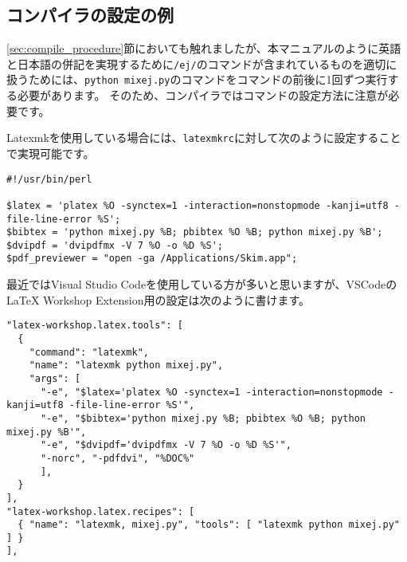 \documentclass[10pt, a4paper]{jsarticle}
\begin{document}
\subsection{コンパイラの設定の例}
\label{sec:compile_config}

\ref{sec:compile_procedure}節においても触れましたが、本マニュアルのように英語と日本語の併記を実現するために\texttt{/ej/}のコマンドが含まれているものを適切に扱うためには、\texttt{python mixej.py}のコマンドを\BibTeX コマンドの前後に1回ずつ実行する必要があります。
そのため、コンパイラでは\BibTeX コマンドの設定方法に注意が必要です。

Latexmkを使用している場合には、\texttt{latexmkrc}に対して次のように設定することで実現可能です。

\noindent\makebox[\linewidth]{\rule{\linewidth}{0.4pt}}\vspace{-0.5zw}
\begin{lstlisting}[style=onecol]
#!/usr/bin/perl

$latex = 'platex %O -synctex=1 -interaction=nonstopmode -kanji=utf8 -file-line-error %S';
$bibtex = 'python mixej.py %B; pbibtex %O %B; python mixej.py %B';
$dvipdf = 'dvipdfmx -V 7 %O -o %D %S';
$pdf_previewer = "open -ga /Applications/Skim.app";
\end{lstlisting}\vspace{-1.8zw}
\noindent\makebox[\linewidth]{\rule{\linewidth}{0.4pt}}\vspace{0.5zw}\par

最近ではVisual Studio Codeを使用している方が多いと思いますが、VSCodeのLaTeX Workshop Extension用の設定は次のように書けます。

\noindent\makebox[\linewidth]{\rule{\linewidth}{0.4pt}}\vspace{-0.5zw}
\begin{lstlisting}[style=onecol]
"latex-workshop.latex.tools": [
  {
    "command": "latexmk",
    "name": "latexmk python mixej.py",
    "args": [
      "-e", "$latex='platex %O -synctex=1 -interaction=nonstopmode -kanji=utf8 -file-line-error %S'",
      "-e", "$bibtex='python mixej.py %B; pbibtex %O %B; python mixej.py %B'",
      "-e", "$dvipdf='dvipdfmx -V 7 %O -o %D %S'",
      "-norc", "-pdfdvi", "%DOC%"
      ],
  }
],
"latex-workshop.latex.recipes": [
  { "name": "latexmk, mixej.py", "tools": [ "latexmk python mixej.py" ] }
],
\end{lstlisting}\vspace{-1.8zw}
\noindent\makebox[\linewidth]{\rule{\linewidth}{0.4pt}}\vspace{0.5zw}\par
\end{document}
